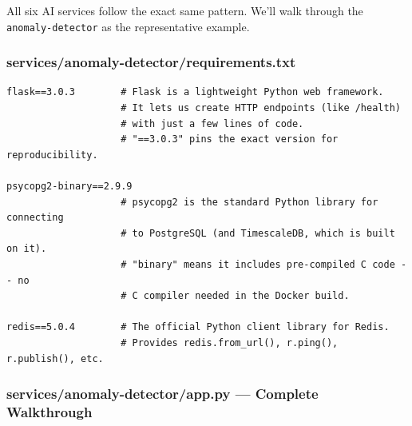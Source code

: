 \documentclass[12pt, a4paper]{article}
\begin{document}
All six AI services follow the exact same pattern. We'll walk through the
\texttt{anomaly-detector} as the representative example.

\subsubsection{services/anomaly-detector/requirements.txt}

\begin{lstlisting}[style=bash, caption={services/anomaly-detector/requirements.txt}]
flask==3.0.3        # Flask is a lightweight Python web framework.
                    # It lets us create HTTP endpoints (like /health)
                    # with just a few lines of code.
                    # "==3.0.3" pins the exact version for reproducibility.

psycopg2-binary==2.9.9
                    # psycopg2 is the standard Python library for connecting
                    # to PostgreSQL (and TimescaleDB, which is built on it).
                    # "binary" means it includes pre-compiled C code -- no
                    # C compiler needed in the Docker build.

redis==5.0.4        # The official Python client library for Redis.
                    # Provides redis.from_url(), r.ping(), r.publish(), etc.
\end{lstlisting}

\subsubsection{services/anomaly-detector/app.py --- Complete Walkthrough}
\end{document}
